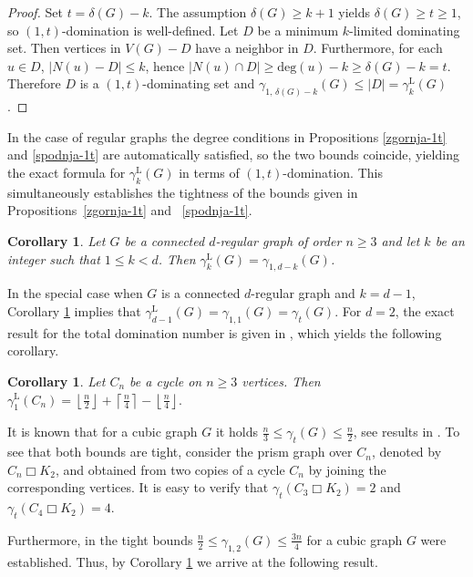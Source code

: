 \documentclass[11pt]{article}
\newtheorem{corollary}[theorem]{Corollary}
\newcommand{\db}[1]{{\color{magenta}#1}}
\newcommand{\gt}{\gamma_t}
\newcommand{\gammakL}{\gamma_k^{\mathrm L}}
\newcommand{\gammaenaL}{\gamma_1^{\mathrm L}}
\begin{document}
\begin{proof}
Set $t=\delta(G)-k$. The assumption $\delta(G)\ge k+1$ yields $\delta(G) \geq t\ge 1$, so $(1,t)$-domination is well-defined. 
Let $D$ be a minimum $k$-limited dominating set.
Then vertices in $V(G)-D$ have a neighbor in $D$. Furthermore,
for each $u\in D$, $|N(u)- D|\le k$, hence $|N(u)\cap D|\ge \text{deg}(u)-k \ge \delta(G)-k=t$. 
Therefore $D$ is a $(1,t)$-dominating set and $\gamma_{1,\,\delta(G)-k}(G)\le |D|=\gammakL(G)$.
\end{proof}


In the case of regular graphs the degree conditions in Propositions 
\ref{zgornja-1t} and \ref{spodnja-1t}
are automatically satisfied, so the two bounds coincide, yielding the exact formula for $\gammakL(G)$ in terms of $(1,t)$-domination.  
This simultaneously establishes the tightness of the bounds given in Propositions~\ref{zgornja-1t} and ~\ref{spodnja-1t}.


\begin{corollary}
\label{d-regular}
Let $G$ be a connected $d$-regular graph of order $n\geq 3$ and let $k$ be an integer such that $1\leq k<d$. Then $\gammakL(G)=\gamma_{1,d-k}(G)$.
\end{corollary}


In the special case when $G$ is a connected $d$-regular graph and $k=d-1$, Corollary \ref{d-regular} implies that $\gamma_{d-1}^{\mathrm L}(G)=\gamma_{1,1}(G)=\gt(G)$. 
For $d=2$, the exact result for the total domination number is given in \cite{MA_Henning}, which yields the following corollary.


\begin{corollary}\label{2-regular}
Let $C_n$ be a cycle on $n\geq 3$ vertices. Then 
$\gammaenaL(C_n)=\left \lfloor \frac n2 \right \rfloor+ \left \lceil \frac n4 \right \rceil - \left \lfloor \frac n4 \right \rfloor.$
\end{corollary}


It is known that for a cubic graph $G$ it holds  $\frac n3
\leq \gamma_t(G)\leq
\frac n2$, see results in 
\cite{Henning}.
To see that both bounds are tight, consider the prism graph over $C_n$, denoted by $C_n\Box K_2$, and obtained from two copies of a cycle $C_n$ by joining the corresponding vertices. It is easy to verify that $\gamma_t(C_3\Box K_2)=2$ and  $\gamma_t(C_4\Box K_2)=4$. 


Furthermore, in \cite{fakhran} the tight bounds $\frac{n}{2}\leq \gamma_{1,2}(G)\leq\frac{3n}{4}$ for a cubic graph $G$ were established. Thus, by Corollary \ref{d-regular} we arrive at the following result.
\end{document}
